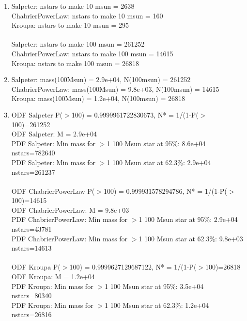 \documentclass{article}
\begin{document}
\begin{enumerate}
\begin{enumerate}
\item %
Salpeter: nstars to make 10 msun = 2638\\
ChabrierPowerLaw: nstars to make 10 msun = 160\\
Kroupa: nstars to make 10 msun = 295\\
\\
Salpeter: nstars to make 100 msun = 261252\\
ChabrierPowerLaw: nstars to make 100 msun = 14615\\
Kroupa: nstars to make 100 msun = 26818

\item %

Salpeter: mass(100Msun) = 2.9e+04, N(100msun) = 261252 \\
ChabrierPowerLaw: mass(100Msun) = 9.8e+03, N(100msun) = 14615 \\
Kroupa: mass(100Msun) = 1.2e+04, N(100msun) = 26818


\item %

ODF Salpeter P($>$100) = 0.9999961722830673, N* = 1/(1-P($>$100)=261252\\
ODF Salpeter: M = 2.9e+04\\
PDF Salpeter: Min mass for $>$1 100 Msun star at 95\%: 8.6e+04 nstars=782640\\
PDF Salpeter: Min mass for $>$1 100 Msun star at 62.3\%: 2.9e+04 nstars=261237\\
\\
ODF ChabrierPowerLaw P($>$100) = 0.999931578294786, N* = 1/(1-P($>$100)=14615\\
ODF ChabrierPowerLaw: M = 9.8e+03\\
PDF ChabrierPowerLaw: Min mass for $>$1 100 Msun star at 95\%: 2.9e+04 nstars=43781\\
PDF ChabrierPowerLaw: Min mass for $>$1 100 Msun star at 62.3\%: 9.8e+03 nstars=14613\\
\\
ODF Kroupa P($>$100) = 0.9999627129687122, N* = 1/(1-P($>$100)=26818\\
ODF Kroupa: M = 1.2e+04\\
PDF Kroupa: Min mass for $>$1 100 Msun star at 95\%: 3.5e+04 nstars=80340\\
PDF Kroupa: Min mass for $>$1 100 Msun star at 62.3\%: 1.2e+04 nstars=26816\\




\end{enumerate}
\end{enumerate}
\end{document}

